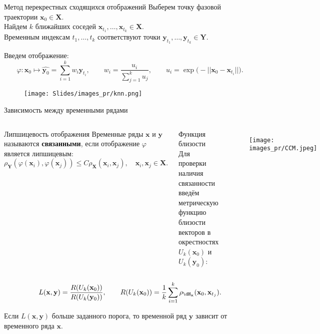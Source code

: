 \documentclass[9pt]{beamer}
\newcommand{\bx}{\mathbf{x}}
\newcommand{\by}{\mathbf{y}}
\newcommand{\bY}{\mathbf{Y}}
\newcommand{\bX}{\mathbf{X}}
\begin{document}
\begin{frame}{Метод перекрестных сходящихся отображений}
\vspace{0.25cm}
Выберем точку фазовой траектории $\bx_0\in\bX$.\\
Найдем $k$ ближайших соседей $\bx_{t_1},\dots, \bx_{t_k}\in \bX$.\\
Временным индексам $t_1,\dots,t_k$ соответствуют точки $\by_{t_1},\dots, \by_{t_k}\in\bY$.
\vspace{0.2cm}
\begin{block}{Введем отображение:}
\vspace{-0.2cm}
\[ \varphi: \bx_0 \mapsto \widehat{\by_0} = \sum\limits_{i=1}^k w_i \by_{t_i}, \qquad 
w_i = \dfrac{u_i}{\sum\limits_{j=1}^k u_j}, \qquad
u_i = \exp \bigl( -||\bx_0 - \bx_{t_i}|| \bigr).\]
\end{block}
\vspace{-0.2cm}
\begin{figure}[h]
\centering
\texttt{[image: Slides/images\_pr/knn.png]}
\end{figure}

\end{frame}
\begin{frame}{Зависимость между временными рядами}
\vspace{-0.5cm}
\begin{columns}
\begin{block}{Липшицевость отображения}
Временные ряды $\bx$ и $\by$ называются \textbf{связанными}, если отображение $\varphi$ является липшицевым:
	$$ \rho_{\bY}(\varphi(\bx_i), \varphi(\bx_j)) \leq C \rho_{\bX}(\bx_i, \bx_j), \quad \bx_i, \bx_j \in \bX. $$
\end{block}
\vspace{-0.4cm}
\begin{block}{Функция близости}
Для проверки наличия связанности введём метрическую функцию близости векторов в окрестностях $U_k(\bx_{0})$ и $U_k(\by_{0})$:
\end{block}
\begin{figure}[h]
\centering
\texttt{[image: images\_pr/CCM.jpeg]}
\end{figure}
\end{columns}


\[
	L(\bx, \by) = \dfrac{R(U_k(\bx_{0}))}{R(U_k(\by_{0}))}, \qquad R(U_k(\bx_{0})) = \dfrac{1}{k} \sum\limits_{i=1}^k \rho_{\dH_{\bx}}(\bx_{0}, \bx_{t_j}).
\]

Если $L(\bx, \by)$ больше заданного порога, то временной ряд $\by$ зависит от временного ряда $\bx$.

\end{frame}
\end{document}
